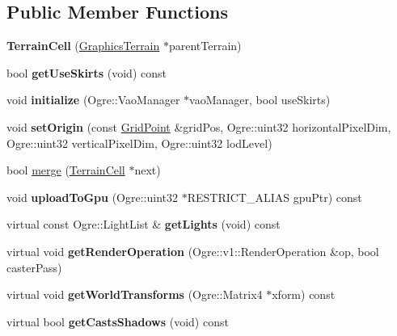 \subsection*{Public Member Functions}
\begin{DoxyCompactItemize}
\item 
\mbox{\label{class_terrain_cell_a8e486aba1ecb56796b8398ab712b9ac2}} 
{\bfseries Terrain\+Cell} (\hyperlink{class_graphics_terrain}{Graphics\+Terrain} $\ast$parent\+Terrain)
\item 
\mbox{\label{class_terrain_cell_a480311a83246c2048b60a6eba1f3e5c1}} 
bool {\bfseries get\+Use\+Skirts} (void) const
\item 
\mbox{\label{class_terrain_cell_a4908343e288dd98834c943f73e7dc6ee}} 
void {\bfseries initialize} (Ogre\+::\+Vao\+Manager $\ast$vao\+Manager, bool use\+Skirts)
\item 
\mbox{\label{class_terrain_cell_ab2dd3afcb1879e45b98c54b108cf0204}} 
void {\bfseries set\+Origin} (const \hyperlink{struct_grid_point}{Grid\+Point} \&grid\+Pos, Ogre\+::uint32 horizontal\+Pixel\+Dim, Ogre\+::uint32 vertical\+Pixel\+Dim, Ogre\+::uint32 lod\+Level)
\item 
bool \hyperlink{class_terrain_cell_a18155abf464d4f6d1f3bf59a21eee301}{merge} (\hyperlink{class_terrain_cell}{Terrain\+Cell} $\ast$next)
\item 
\mbox{\label{class_terrain_cell_a3d59cf3485f39a7c21411eeaaffcd92a}} 
void {\bfseries upload\+To\+Gpu} (Ogre\+::uint32 $\ast$R\+E\+S\+T\+R\+I\+C\+T\+\_\+\+A\+L\+I\+AS gpu\+Ptr) const
\item 
\mbox{\label{class_terrain_cell_a798bc5d90c5fd2f3a840fb7f6d01d3b4}} 
virtual const Ogre\+::\+Light\+List \& {\bfseries get\+Lights} (void) const
\item 
\mbox{\label{class_terrain_cell_af9cce8bdbcd17ba23a98d49197619f76}} 
virtual void {\bfseries get\+Render\+Operation} (Ogre\+::v1\+::\+Render\+Operation \&op, bool caster\+Pass)
\item 
\mbox{\label{class_terrain_cell_af87d546b5cdcc1eb14b53f966765b8d4}} 
virtual void {\bfseries get\+World\+Transforms} (Ogre\+::\+Matrix4 $\ast$xform) const
\item 
\mbox{\label{class_terrain_cell_ae50fc017b6a731a35c4764df52f46628}} 
virtual bool {\bfseries get\+Casts\+Shadows} (void) const
\end{DoxyCompactItemize}


